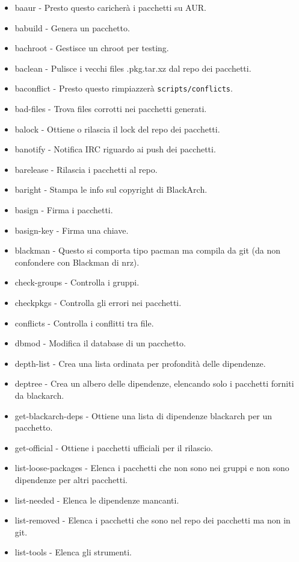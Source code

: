 \documentclass[a4paper, oneside, 11pt]{book}
\begin{document}
\begin{itemize}
\item baaur - Presto questo caricherà i pacchetti su AUR.
\item babuild - Genera un pacchetto.
\item bachroot - Gestisce un chroot per testing.
\item baclean - Pulisce i vecchi files .pkg.tar.xz dal repo dei pacchetti.
\item baconflict - Presto questo rimpiazzerà \verb|scripts/conflicts|.
\item bad-files - Trova files corrotti nei pacchetti generati.
\item balock - Ottiene o rilascia il lock del repo dei pacchetti.
\item banotify - Notifica IRC riguardo ai push dei pacchetti.
\item barelease - Rilascia i pacchetti al repo.
\item baright - Stampa le info sul copyright di BlackArch.
\item basign - Firma i pacchetti.
\item basign-key - Firma una chiave.
\item blackman - Questo si comporta tipo pacman ma compila da git (da non confondere con Blackman di nrz).
\item check-groups - Controlla i gruppi.
\item checkpkgs - Controlla gli errori nei pacchetti.
\item conflicts - Controlla i conflitti tra file.
\item dbmod - Modifica il database di un pacchetto.
\item depth-list - Crea una lista ordinata per profondità delle dipendenze.
\item deptree - Crea un albero delle dipendenze, elencando solo i pacchetti forniti da blackarch.
\item get-blackarch-deps - Ottiene una lista di dipendenze blackarch per un pacchetto.
\item get-official - Ottiene i pacchetti ufficiali per il rilascio.
\item list-loose-packages - Elenca i pacchetti che non sono nei gruppi e non sono
    dipendenze per altri pacchetti.
\item list-needed - Elenca le dipendenze mancanti.
\item list-removed - Elenca i pacchetti che sono nel repo dei pacchetti ma non in git.
\item list-tools - Elenca gli strumenti.

\end{itemize}
\end{document}
